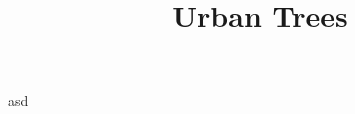 \documentclass[letterpaper,11pt]{article}
\begin{document}
\title{Urban Trees}
\maketitle

asd
\end{document}
